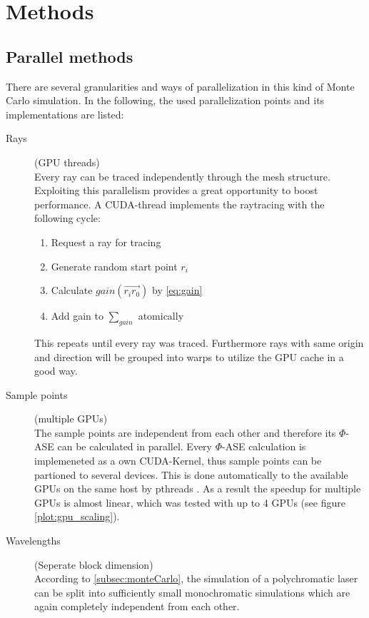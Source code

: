 \section{Methods}


\subsection{Parallel methods}
There are several granularities and ways of parallelization in this kind of 
Monte Carlo simulation. In the following, the used parallelization points and
its implementations are listed:

\begin{description}

\item[Rays] (GPU threads)\\
    Every ray can be traced independently through the mesh structure.
    Exploiting this parallelism provides a great opportunity to boost
    performance. A CUDA-thread implements the raytracing with the 
    following cycle:
    \begin{enumerate}
      \item Request a ray for tracing
      \item Generate random start point $r_i$
      \item Calculate $gain(\overrightarrow{r_ir_0})$ by \eqref{eq:gain}
      \item Add gain to $\sum_{gain}$ atomically
    \end{enumerate}
    This repeats until every ray was traced. Furthermore rays with same
    origin and direction will be grouped into warps to utilize the
    GPU cache in a good way.

  \item[Sample points] (multiple GPUs)\\
    The sample points are independent from each other
    and therefore its $\Phi$-ASE can be calculated in parallel. Every $\Phi$-ASE
    calculation is implemeneted as a own CUDA-Kernel, thus sample points can be partioned 
    to several devices. This is done automatically to the available GPUs on
    the same host by pthreads \cite{pthreads}. As a result the speedup for multiple
    GPUs is almost linear, which was tested with up to 4 GPUs (see figure \ref{plot:gpu_scaling}).

  \item[Wavelengths] (Seperate block dimension)\\
    According to \ref{subsec:monteCarlo}, the simulation of a polychromatic
    laser can be split into sufficiently small monochromatic simulations which
    are again completely independent from each other.

\end{description}

